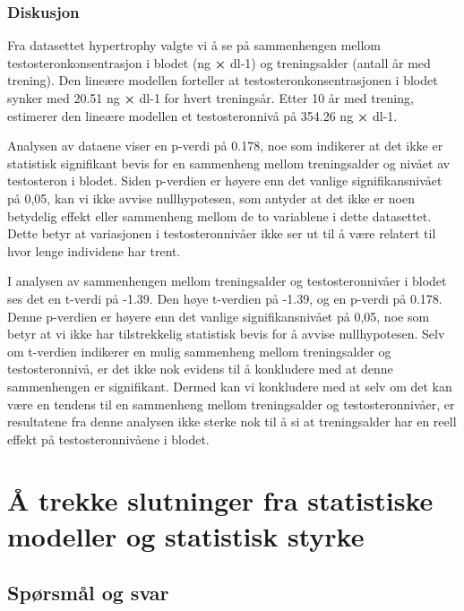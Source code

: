 \documentclass[
  letterpaper,
  DIV=11,
  numbers=noendperiod]{scrreprt}
\begin{document}
\subsection{Diskusjon}\label{diskusjon-3}

Fra datasettet hypertrophy valgte vi å se på sammenhengen mellom
testosteronkonsentrasjon i blodet (ng \textbf{×} dl-1) og treningsalder
(antall år med trening). Den lineære modellen forteller at
testosteronkonsentrasjonen i blodet synker med 20.51 ng \textbf{×} dl-1
for hvert treningsår. Etter 10 år med trening, estimerer den lineære
modellen et testosteronnivå på 354.26 ng \textbf{×} dl-1.

Analysen av dataene viser en p-verdi på 0.178, noe som indikerer at det
ikke er statistisk signifikant bevis for en sammenheng mellom
treningsalder og nivået av testosteron i blodet. Siden p-verdien er
høyere enn det vanlige signifikansnivået på 0,05, kan vi ikke avvise
nullhypotesen, som antyder at det ikke er noen betydelig effekt eller
sammenheng mellom de to variablene i dette datasettet. Dette betyr at
variasjonen i testosteronnivåer ikke ser ut til å være relatert til hvor
lenge individene har trent.

I analysen av sammenhengen mellom treningsalder og testosteronnivåer i
blodet ses det en t-verdi på -1.39. Den høye t-verdien på -1.39, og en
p-verdi på 0.178. Denne p-verdien er høyere enn det vanlige
signifikansnivået på 0,05, noe som betyr at vi ikke har tilstrekkelig
statistisk bevis for å avvise nullhypotesen. Selv om t-verdien indikerer
en mulig sammenheng mellom treningsalder og testosteronnivå, er det ikke
nok evidens til å konkludere med at denne sammenhengen er signifikant.
Dermed kan vi konkludere med at selv om det kan være en tendens til en
sammenheng mellom treningsalder og testosteronnivåer, er resultatene fra
denne analysen ikke sterke nok til å si at treningsalder har en reell
effekt på testosteronnivåene i blodet.


\chapter{Å trekke slutninger fra statistiske modeller og statistisk
styrke}\label{uxe5-trekke-slutninger-fra-statistiske-modeller-og-statistisk-styrke}

\section{Spørsmål og svar}\label{spuxf8rsmuxe5l-og-svar}
\end{document}
